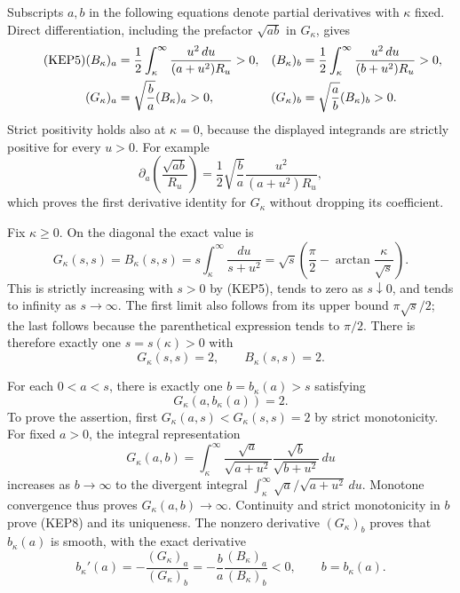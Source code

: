 Subscripts $a,b$ in the following equations denote partial derivatives
with $\kappa$ fixed. Direct differentiation, including the prefactor
$\sqrt{ab}$ in $G_\kappa$, gives
\begin{align}\tag{KEP5}
 (B_\kappa)_a&=\frac12\int_\kappa^\infty
               \frac{u^2\,du}{(a+u^2)R_u}>0,
 & (B_\kappa)_b&=\frac12\int_\kappa^\infty
               \frac{u^2\,du}{(b+u^2)R_u}>0,\\
 (G_\kappa)_a&=\sqrt{\frac ba}(B_\kappa)_a>0,
 & (G_\kappa)_b&=\sqrt{\frac ab}(B_\kappa)_b>0.\notag
\end{align}
Strict positivity holds also at $\kappa=0$, because the displayed integrands
are strictly positive for every $u>0$. For example
\[
 \partial_a\left(\frac{\sqrt{ab}}{R_u}\right)
 =\frac12\sqrt{\frac ba}\frac{u^2}{(a+u^2)R_u},
\]
which proves the first derivative identity for $G_\kappa$ without dropping
its coefficient.

Fix $\kappa\geq0$. On the diagonal the exact value is
\begin{equation}\tag{KEP6}
 G_\kappa(s,s)=B_\kappa(s,s)
 =s\int_\kappa^\infty\frac{du}{s+u^2}
 =\sqrt{s}\left(\frac\pi2-\arctan\frac \kappa{\sqrt{s}}\right).
\end{equation}
This is strictly increasing with $s>0$ by (KEP5), tends to zero as
$s\downarrow0$, and tends to infinity as $s\to\infty$. The first limit
also follows from its upper bound $\pi\sqrt{s}/2$; the last follows
because the parenthetical expression tends to $\pi/2$. There is therefore
exactly one $s=s(\kappa)>0$ with
\begin{equation}\tag{KEP7}
 G_\kappa(s,s)=2,
 \qquad B_\kappa(s,s)=2.
\end{equation}

For each $0<a<s$, there is exactly one $b=b_\kappa(a)>s$ satisfying
\begin{equation}\tag{KEP8}
 G_\kappa(a,b_\kappa(a))=2.
\end{equation}
To prove the assertion, first $G_\kappa(a,s)<G_\kappa(s,s)=2$ by strict
monotonicity. For fixed $a>0$, the integral representation
\[
 G_\kappa(a,b)=\int_\kappa^\infty
  \frac{\sqrt a}{\sqrt{a+u^2}}
  \frac{\sqrt b}{\sqrt{b+u^2}}\,du
\]
increases as $b\to\infty$ to the divergent integral
$\int_\kappa^\infty\sqrt a/\sqrt{a+u^2}\,du$.
Monotone convergence thus proves $G_\kappa(a,b)\to\infty$.
Continuity and strict monotonicity in $b$ prove (KEP8) and its uniqueness.
The nonzero derivative $(G_\kappa)_b$ proves that $b_\kappa(a)$ is smooth, with
the exact derivative
\begin{equation}\tag{KEP9}
 b_\kappa'(a)=-\frac{(G_\kappa)_a}{(G_\kappa)_b}
        =-\frac ba\frac{(B_\kappa)_a}{(B_\kappa)_b}<0,
 \qquad b=b_\kappa(a).
\end{equation}


